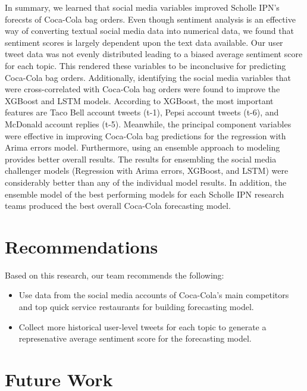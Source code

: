 \documentclass[12pt,oneside]{chicagocapstone}
\providecommand{\tightlist}{%
  \setlength{\itemsep}{0pt}\setlength{\parskip}{0pt}}
\begin{document}
In summary, we learned that social media variables improved Scholle IPN's forecsts of Coca-Cola bag orders. Even though sentiment analysis is an effective way of converting textual social media data into numerical data, we found that sentiment scores is largely dependent upon the text data available. Our user tweet data was not evenly distributed leading to a biased average sentiment score for each topic. This rendered these variables to be inconclusive for predicting Coca-Cola bag orders. Additionally, identifying the social media variables that were cross-correlated with Coca-Cola bag orders were found to improve the XGBoost and LSTM models. According to XGBoost, the most important features are Taco Bell account tweets (t-1), Pepsi account tweets (t-6), and McDonald account replies (t-5). Meanwhile, the principal component variables were effective in improving Coca-Cola bag predictions for the regression with Arima errors model. Furthermore, using an ensemble approach to modeling provides better overall results. The results for ensembling the social media challenger models (Regression with Arima errors, XGBoost, and LSTM) were considerably better than any of the individual model results. In addition, the ensemble model of the best performing models for each Scholle IPN research teams produced the best overall Coca-Cola forecasting model.

\hypertarget{recommendations}{%
\chapter*{Recommendations}\label{recommendations}}

Based on this research, our team recommends the following:
\begin{itemize}
\tightlist
\item
  Use data from the social media accounts of Coca-Cola's main competitors and top quick service restaurants for building forecasting model.
\item
  Collect more historical user-level tweets for each topic to generate a represenative average sentiment score for the forecasting model.
\end{itemize}
\hypertarget{future-work}{%
\chapter*{Future Work}\label{future-work}}
\end{document}
